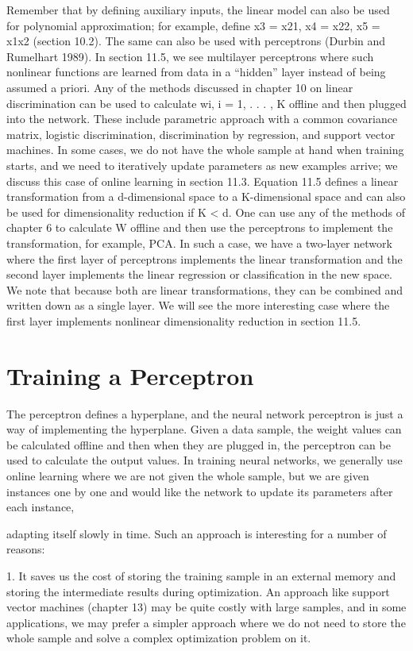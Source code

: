 Remember that by defining auxiliary inputs, the linear model can also be used for polynomial approximation; for example, define x3 = x21, x4 = x22, x5 = x1x2 (section 10.2). The same can also be used with perceptrons (Durbin and Rumelhart 1989). In section 11.5, we see multilayer perceptrons where such nonlinear functions are learned from data in a “hidden” layer instead of being assumed a priori. Any of the methods discussed in chapter 10 on linear discrimination can be used to calculate wi, i = 1, . . . , K offline and then plugged into the network. These include parametric approach with a common covariance matrix, logistic discrimination, discrimination by regression, and support vector machines. In some cases, we do not have the whole sample at hand when training starts, and we need to iteratively update parameters as new examples arrive; we discuss this case of online learning in section 11.3. Equation 11.5 defines a linear transformation from a d-dimensional space to a K-dimensional space and can also be used for dimensionality reduction if K < d. One can use any of the methods of chapter 6 to calculate W offline and then use the perceptrons to implement the transformation, for example, PCA. In such a case, we have a two-layer network where the first layer of perceptrons implements the linear transformation and the second layer implements the linear regression or classification in the new space. We note that because both are linear transformations, they can be combined and written down as a single layer. We will see the more interesting case where the first layer implements nonlinear dimensionality reduction in section 11.5.

\section{Training a Perceptron}

The perceptron defines a hyperplane, and the neural network perceptron is just a way of implementing the hyperplane. Given a data sample, the weight values can be calculated offline and then when they are plugged in, the perceptron can be used to calculate the output values. In training neural networks, we generally use online learning where we are not given the whole sample, but we are given instances one by one and would like the network to update its parameters after each instance,

adapting itself slowly in time. Such an approach is interesting for a number of reasons:

1. It saves us the cost of storing the training sample in an external memory and storing the intermediate results during optimization. An approach like support vector machines (chapter 13) may be quite costly with large samples, and in some applications, we may prefer a simpler approach where we do not need to store the whole sample and solve a complex optimization problem on it.

